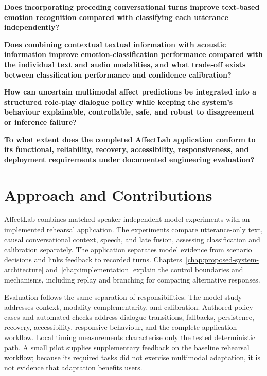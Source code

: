 \begin{description}[itemsep=0.25em, topsep=0.4em, parsep=0pt]
    \item[\textbf{RQ1.}] \textbf{Does incorporating preceding conversational turns improve text-based emotion recognition compared with classifying each utterance independently?}

    \item[\textbf{RQ2.}] \textbf{Does combining contextual textual information with acoustic information improve emotion-classification performance compared with the individual text and audio modalities, and what trade-off exists between classification performance and confidence calibration?}

    \item[\textbf{RQ3.}] \textbf{How can uncertain multimodal affect predictions be integrated into a structured role-play dialogue policy while keeping the system's behaviour explainable, controllable, safe, and robust to disagreement or inference failure?}

    \item[\textbf{RQ4.}] \textbf{To what extent does the completed AffectLab application conform to its functional, reliability, recovery, accessibility, responsiveness, and deployment requirements under documented engineering evaluation?}
\end{description}

\section{Approach and Contributions}
\label{sec:proposed-approach}
\label{sec:contributions}

AffectLab combines matched speaker-independent model experiments with an implemented rehearsal application. The experiments compare utterance-only text, causal conversational context, speech, and late fusion, assessing classification and calibration separately. The application separates model evidence from scenario decisions and links feedback to recorded turns. Chapters~\ref{chap:proposed-system-architecture} and~\ref{chap:implementation} explain the control boundaries and mechanisms, including replay and branching for comparing alternative responses.

Evaluation follows the same separation of responsibilities. The model study addresses context, modality complementarity, and calibration. Authored policy cases and automated checks address dialogue transitions, fallbacks, persistence, recovery, accessibility, responsive behaviour, and the complete application workflow. Local timing measurements characterise only the tested deterministic path. A small pilot supplies supplementary feedback on the baseline rehearsal workflow; because its required tasks did not exercise multimodal adaptation, it is not evidence that adaptation benefits users.

